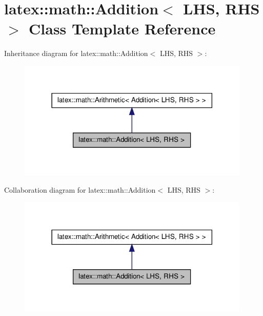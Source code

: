 \hypertarget{classlatex_1_1math_1_1Addition}{\section{latex\-:\-:math\-:\-:\-Addition$<$ \-L\-H\-S, \-R\-H\-S $>$ \-Class \-Template \-Reference}
\label{classlatex_1_1math_1_1Addition}
}


\-Inheritance diagram for latex\-:\-:math\-:\-:\-Addition$<$ \-L\-H\-S, \-R\-H\-S $>$\-:
\nopagebreak
\begin{figure}[H]
\begin{center}
\leavevmode
\includegraphics[width=314pt]{classlatex_1_1math_1_1Addition__inherit__graph}
\end{center}
\end{figure}


\-Collaboration diagram for latex\-:\-:math\-:\-:\-Addition$<$ \-L\-H\-S, \-R\-H\-S $>$\-:
\nopagebreak
\begin{figure}[H]
\begin{center}
\leavevmode
\includegraphics[width=314pt]{classlatex_1_1math_1_1Addition__coll__graph}
\end{center}
\end{figure}
